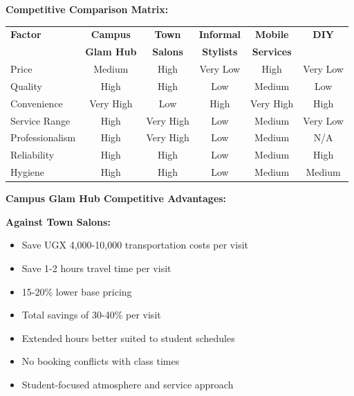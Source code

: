 \documentclass[a4paper,12pt]{article}
\begin{document}
\vspace{1em}

\textbf{Competitive Comparison Matrix:}

\begin{center}
\begin{tabular}{|l|c|c|c|c|c|}
\hline
\textbf{Factor} & \textbf{Campus} & \textbf{Town} & \textbf{Informal} & \textbf{Mobile} & \textbf{DIY} \\
 & \textbf{Glam Hub} & \textbf{Salons} & \textbf{Stylists} & \textbf{Services} & \\
\hline
Price & Medium & High & Very Low & High & Very Low \\
\hline
Quality & High & High & Low & Medium & Low \\
\hline
Convenience & Very High & Low & High & Very High & High \\
\hline
Service Range & High & Very High & Low & Medium & Very Low \\
\hline
Professionalism & High & Very High & Low & Medium & N/A \\
\hline
Reliability & High & High & Low & Medium & High \\
\hline
Hygiene & High & High & Low & Medium & Medium \\
\hline
\end{tabular}
\end{center}

\vspace{1em}

\textbf{Campus Glam Hub Competitive Advantages:}

\textbf{Against Town Salons:}
\begin{itemize}[leftmargin=2em]
    \item Save UGX 4,000-10,000 transportation costs per visit
    \item Save 1-2 hours travel time per visit
    \item 15-20\% lower base pricing
    \item Total savings of 30-40\% per visit
    \item Extended hours better suited to student schedules
    \item No booking conflicts with class times
    \item Student-focused atmosphere and service approach
\end{itemize}
\end{document}
